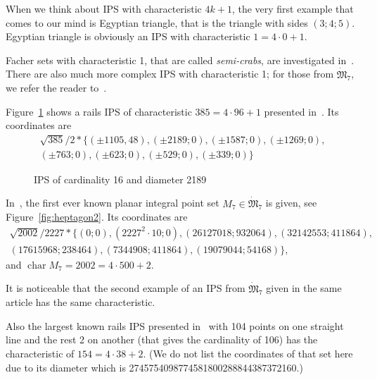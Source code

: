 \documentclass[a4paper,14pt]{article} %
\theoremstyle{plain}
\theoremstyle{definition}
\DeclareMathOperator{\chr}{char}
\begin{document}
When we think about IPS with characteristic $4k+1$,
the very first example that comes to our mind is Egyptian triangle,
that is the triangle with sides $(3;4;5)$.
Egyptian triangle is obviously an IPS with characteristic $1 = 4 \cdot 0 +1$.

Facher sets with characteristic 1, that are called \emph{semi-crabs},
are investigated in~\cite{antonov2008maximal}.
There are also much more complex IPS with characteristic 1;
for those from $\dot{\mathfrak{M}}_7$, we refer the reader to~\cite{kurz2013constructing}.

Figure~\ref{fig:char385} shows a rails IPS of characteristic $385 = 4 \cdot 96 + 1$ presented in~\cite{avdeev2019particular}.
Its coordinates are
\begin{multline}
	\sqrt{385}/{2} * \{ (\pm 1105, 48),
	(\pm 2189 ; 0),
	(\pm 1587 ; 0),
	(\pm 1269 ; 0),
	\\
	(\pm 763 ; 0),
	(\pm 623 ; 0),
	(\pm 529 ; 0),
	(\pm 339 ; 0)\}
\end{multline}

\begin{figure}
\caption{IPS of cardinality 16 and diameter 2189}
\label{fig:char385}
\end{figure}

In~\cite{kreisel2008heptagon}, the first ever known
planar integral point set $M_7 \in \dot{\mathfrak{M}}_7$ is given,
see Figure~\ref{fig:heptagon2}.
Its coordinates are
\begin{multline}
\sqrt{2002}/2227 * \{ (0;0), (2227^2\cdot10;0), (26127018;932064), (32 142 553; 411 864),
\\
	 (17615968;238464), (7 344 908;411 864), (19079044; 54168)\}
	 ,
\end{multline}
and
$
	\chr M_7 = 2002 = 4\cdot 500 + 2
$.

It is noticeable that the second example of an IPS from $\dot{\mathfrak{M}}_7$
given in the same article has the same characteristic.

Also the largest known rails IPS presented in~\cite{momot2022example}
with 104 points on one straight line and the rest 2 on another
(that gives the cardinality of 106) has the characteristic of $154 = 4 \cdot 38 + 2$.
(We do not list the coordinates of that set here due to its diameter which is 2745754098774581800288844387372160.)
\end{document}
